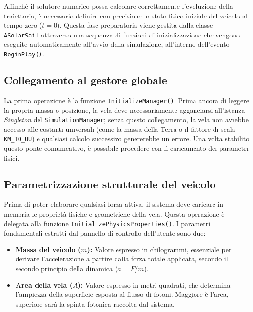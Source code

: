 Affinché il solutore numerico possa calcolare correttamente l'evoluzione della traiettoria, è necessario definire con precisione lo stato fisico iniziale del veicolo al tempo zero ($t=0$). Questa fase preparatoria viene gestita dalla classe \lstinline|ASolarSail| attraverso una sequenza di funzioni di inizializzazione che vengono eseguite automaticamente all'avvio della simulazione, all'interno dell'evento \lstinline|BeginPlay()|.


\subsection{Collegamento al gestore globale}

La prima operazione è la funzione \lstinline|InitializeManager()|. Prima ancora di leggere la propria massa o posizione, la vela deve necessariamente agganciarsi all'istanza \textit{Singleton} del \lstinline|SimulationManager|; senza questo collegamento, la vela non avrebbe accesso alle costanti universali (come la massa della Terra o il fattore di scala \lstinline|KM_TO_UU|) e qualsiasi calcolo successivo genererebbe un errore. Una volta stabilito questo ponte comunicativo, è possibile procedere con il caricamento dei parametri fisici.


\subsection{Parametrizzazione strutturale del veicolo}

Prima di poter elaborare qualsiasi forza attiva, il sistema deve caricare in memoria le proprietà fisiche e geometriche della vela. Questa operazione è delegata alla funzione \lstinline|InitializePhysicsProperties()|. I parametri fondamentali estratti dal pannello di controllo dell'utente sono due:

\begin{itemize}
    \item \textbf{Massa del veicolo ($m$):} Valore espresso in chilogrammi, essenziale per derivare l'accelerazione a partire dalla forza totale applicata, secondo il secondo principio della dinamica ($a = F/m$).
    \item \textbf{Area della vela ($A$):} Valore espresso in metri quadrati, che determina l'ampiezza della superficie esposta al flusso di fotoni. Maggiore è l'area, superiore sarà la spinta fotonica raccolta dal sistema.
\end{itemize}


